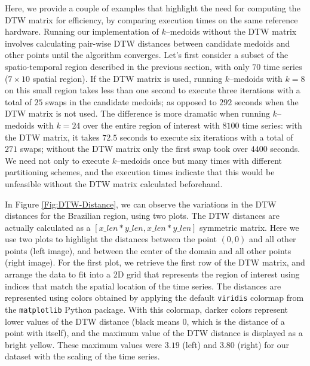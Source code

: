 Here, we provide a couple of examples that highlight the need for computing the DTW matrix for efficiency, by comparing execution times on the same reference hardware. Running our implementation of $k$--medoids without the DTW matrix involves calculating pair-wise DTW distances between candidate medoids and other points until the algorithm converges. Let's first consider a subset of the spatio-temporal region described in the previous section, with only $70$ time series ($7 \times 10$ spatial region). If the DTW matrix is used, running $k$--medoids with $k=8$ on this small region takes less than one second to execute three iterations with a total of $25$ swaps in the candidate medoids; as opposed to $292$ seconds when the DTW matrix is not used. The difference is more dramatic when running $k$--medoids with $k=24$ over the entire region of interest with $8100$ time series: with the DTW matrix, it  takes $72.5$ seconds to execute six iterations with a total of $271$ swaps; without the DTW matrix only the first swap took over $4400$ seconds. We need not only to execute $k$--medoids once but many times with different partitioning schemes, and the execution times indicate that this would be unfeasible without the DTW matrix calculated beforehand.

In Figure \ref{Fig:DTW-Distance}, we can observe the variations in the DTW distances for the Brazilian region, using two plots. The DTW distances are actually calculated as a $[x\_len * y\_len, x\_len * y\_len]$ symmetric matrix. Here we use two plots to highlight the distances between the point $(0, 0)$ and all other points (left image), and between the center of the domain and all other points (right image). For the first plot, we retrieve the first row of the DTW matrix, and arrange the data to fit into a 2D grid that represents the region of interest using indices that match the spatial location of the time series. The distances are represented using colors obtained by applying the default \texttt{viridis} colormap from the \texttt{matplotlib} Python package. With this colormap, darker colors represent lower values of the DTW distance (black means 0, which is the distance of a point with itself), and the maximum value of the DTW distance is displayed as a bright yellow. These maximum values were $3.19$ (left) and $3.80$ (right) for our dataset with the scaling of the time series.

